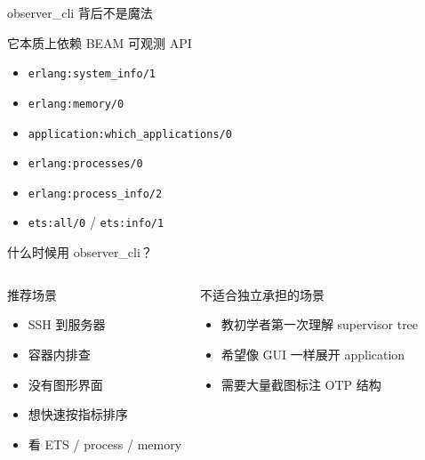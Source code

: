 \documentclass[aspectratio=169, 9pt]{beamer}
\newcommand{\code}[1]{\texttt{#1}}
\begin{document}
\begin{frame}{observer\_cli 背后不是魔法}
  \begin{block}{它本质上依赖 BEAM 可观测 API}
    \begin{itemize}
      \item \code{erlang:system\_info/1}
      \item \code{erlang:memory/0}
      \item \code{application:which\_applications/0}
      \item \code{erlang:processes/0}
      \item \code{erlang:process\_info/2}
      \item \code{ets:all/0} / \code{ets:info/1}
    \end{itemize}
  \end{block}
\end{frame}

\begin{frame}{什么时候用 observer\_cli？}
  \begin{columns}[T,onlytextwidth]
    \begin{block}{推荐场景}
      \begin{itemize}
        \item SSH 到服务器
        \item 容器内排查
        \item 没有图形界面
        \item 想快速按指标排序
        \item 看 ETS / process / memory
      \end{itemize}
    \end{block}
    \begin{alertblock}{不适合独立承担的场景}
      \begin{itemize}
        \item 教初学者第一次理解 supervisor tree
        \item 希望像 GUI 一样展开 application
        \item 需要大量截图标注 OTP 结构
      \end{itemize}
    \end{alertblock}
  \end{columns}
\end{frame}
\end{document}
